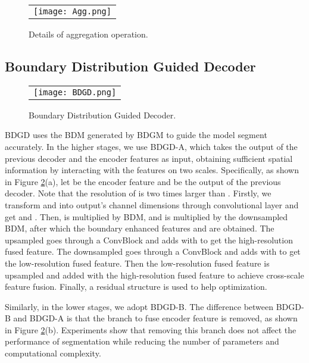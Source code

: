 \documentclass[]{spie}
\begin{document}
\begin{figure} [ht]
\begin{center}
\begin{tabular}{c} \texttt{[image: Agg.png]}
\end{tabular}
\end{center}
\caption[example]
{ \label{fig4} 
Details of aggregation operation.}
\end{figure} 

\subsection{Boundary Distribution Guided Decoder}

\begin{figure} [ht]
\begin{center}
\begin{tabular}{c} \texttt{[image: BDGD.png]}
\end{tabular}
\end{center}
\caption[example]
{ \label{fig5} 
Boundary Distribution Guided Decoder.}
\end{figure} 

BDGD uses the BDM generated by BDGM to guide the model segment accurately. In the higher stages, we use BDGD-A, which takes the output of the previous decoder and the encoder features as input, obtaining sufficient spatial information by interacting with the features on two scales. Specifically, as shown in Figure \ref{fig5}(a), let  be the encoder feature and  be the output of the previous decoder. Note that the resolution of  is two times larger than . Firstly, we transform  and  into output's channel dimensions through convolutional layer and get  and . Then,  is multiplied by BDM, and  is multiplied by the downsampled BDM, after which the boundary enhanced features  and  are obtained. The upsampled  goes through a ConvBlock and adds with  to get the high-resolution fused feature. The downsampled  goes through a ConvBlock and adds with  to get the low-resolution fused feature. Then the low-resolution fused feature is upsampled and added with the high-resolution fused feature to achieve cross-scale feature fusion. Finally, a residual structure is used to help optimization.

Similarly, in the lower stages, we adopt BDGD-B. The difference between BDGD-B and BDGD-A is that the branch to fuse encoder feature is removed, as shown in Figure \ref{fig5}(b). Experiments show that removing this branch does not affect the performance of segmentation while reducing the number of parameters and computational complexity.
\end{document}
